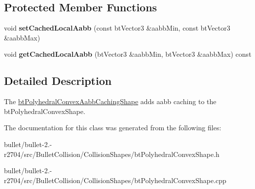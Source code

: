 \subsection*{Protected Member Functions}
\begin{DoxyCompactItemize}
\item 
\hypertarget{classbt_polyhedral_convex_aabb_caching_shape_a7ee0875ea0eba67b0fefce10ec6ba8e4}{void {\bfseries set\+Cached\+Local\+Aabb} (const bt\+Vector3 \&aabb\+Min, const bt\+Vector3 \&aabb\+Max)}\label{classbt_polyhedral_convex_aabb_caching_shape_a7ee0875ea0eba67b0fefce10ec6ba8e4}

\item 
\hypertarget{classbt_polyhedral_convex_aabb_caching_shape_a1353a5604adaba36ec46c377fb600b9d}{void {\bfseries get\+Cached\+Local\+Aabb} (bt\+Vector3 \&aabb\+Min, bt\+Vector3 \&aabb\+Max) const }\label{classbt_polyhedral_convex_aabb_caching_shape_a1353a5604adaba36ec46c377fb600b9d}

\end{DoxyCompactItemize}


\subsection{Detailed Description}
The \hyperlink{classbt_polyhedral_convex_aabb_caching_shape}{bt\+Polyhedral\+Convex\+Aabb\+Caching\+Shape} adds aabb caching to the bt\+Polyhedral\+Convex\+Shape. 

The documentation for this class was generated from the following files\+:\begin{DoxyCompactItemize}
\item 
bullet/bullet-\/2.-\/r2704/src/\+Bullet\+Collision/\+Collision\+Shapes/bt\+Polyhedral\+Convex\+Shape.\+h\item 
bullet/bullet-\/2.-\/r2704/src/\+Bullet\+Collision/\+Collision\+Shapes/bt\+Polyhedral\+Convex\+Shape.\+cpp\end{DoxyCompactItemize}

